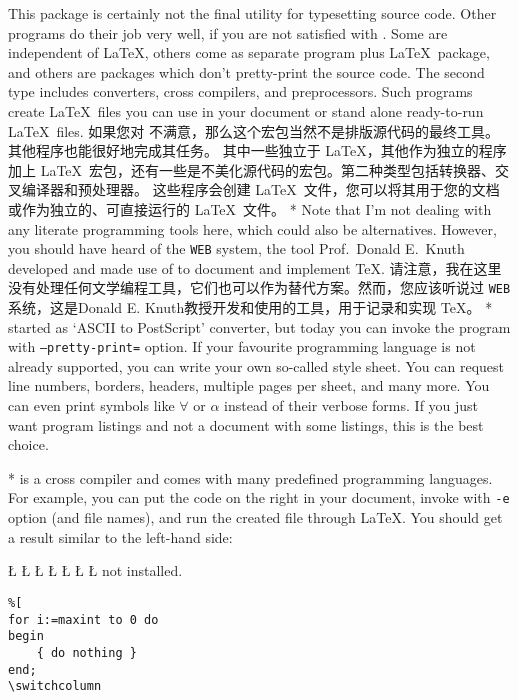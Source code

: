 \begin{paracol}{2}
This package is certainly not the final utility for typesetting source code.
Other programs do their job very well, if you are not satisfied with
. Some are independent of \LaTeX, others come as
separate program plus \LaTeX\ package, and others are packages which
don't pretty-print the source code. The second type includes converters,
cross compilers, and preprocessors. Such programs create \LaTeX\ files
you can use in your document or stand alone ready-to-run \LaTeX\ files.
\switchcolumn
如果您对  不满意，那么这个宏包当然不是排版源代码的最终工具。其他程序也能很好地完成其任务。
其中一些独立于 \LaTeX，其他作为独立的程序加上 \LaTeX\ 宏包，还有一些是不美化源代码的宏包。第二种类型包括转换器、交叉编译器和预处理器。
这些程序会创建 \LaTeX\ 文件，您可以将其用于您的文档或作为独立的、可直接运行的 \LaTeX\ 文件。
\switchcolumn[0]*%
Note that I'm not dealing with any literate programming tools here, which
could also be alternatives. However, you should have heard of the
\texttt{WEB} system, the tool Prof.~Donald E.~Knuth developed and made use
of to document and implement \TeX.
\switchcolumn
请注意，我在这里没有处理任何文学编程工具，它们也可以作为替代方案。然而，您应该听说过 \texttt{WEB}系统，这是Donald E. Knuth教授开发和使用的工具，用于记录和实现 \TeX。
\switchcolumn[0]*%
\textbf{\href{http://www.infres.enst.fr/~demaille/a2ps}{}}
started as `ASCII to PostScript' converter, but today you can invoke the
program with \texttt{--pretty-print=} option. If your
favourite programming language is not already supported, you can write your
own so-called style sheet. You can request line numbers, borders, headers,
multiple pages per sheet, and many more. You can even print symbols like
$\forall$ or $\alpha$ instead of their verbose forms. If you just want
program listings and not a document with some listings, this is the best
choice.
\switchcolumn

\switchcolumn[0]*%
\textbf{\href{http://mirror.ctan.org/support/lgrind}{}}
is a cross compiler and comes with many predefined programming languages.
For example, you can put the code on the right in your document, invoke
 with \texttt{-e} option (and file names), and run the
created file through \LaTeX. You should get a result similar to the
left-hand side:
\begin{center}
\begin{minipage}{0.45\linewidth}
\iflgrind
   \LGindent=0pt
   \LGinlinefalse\LGbegin\lgrinde
   \L{}
   \L{}
   \L{}
   \L{}
   \L{\LB{}}
   \L{}
   \L{}
   \endlgrinde\LGend
\else
    not installed.
\fi
\end{minipage}
\begin{minipage}{0.45\linewidth}
\begin{verbatim}
%[
for i:=maxint to 0 do
begin
    { do nothing }
end;
\switchcolumn


\end{verbatim}
\end{minipage}
\end{center}
\end{paracol}
